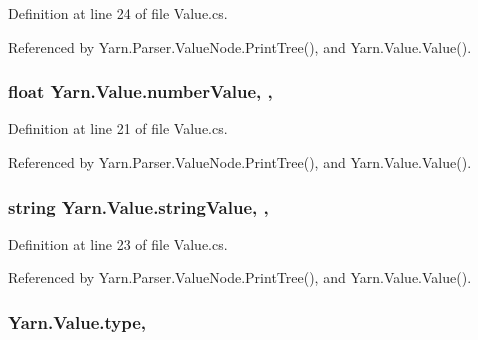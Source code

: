 Definition at line 24 of file Value.\-cs.



Referenced by Yarn.\-Parser.\-Value\-Node.\-Print\-Tree(), and Yarn.\-Value.\-Value().

\hypertarget{a00181_ae1892c1c7a8177537d1caa39a2e51da6}{
\subsubsection[{number\-Value}]{\setlength{\rightskip}{0pt plus 5cm}float Yarn.\-Value.\-number\-Value\hspace{0.3cm}{\ttfamily [get]}, {\ttfamily [set]}, {\ttfamily [package]}}}\label{a00181_ae1892c1c7a8177537d1caa39a2e51da6}


Definition at line 21 of file Value.\-cs.



Referenced by Yarn.\-Parser.\-Value\-Node.\-Print\-Tree(), and Yarn.\-Value.\-Value().

\hypertarget{a00181_add1b07146f1a9e4b655b33c93d07dff9}{
\subsubsection[{string\-Value}]{\setlength{\rightskip}{0pt plus 5cm}string Yarn.\-Value.\-string\-Value\hspace{0.3cm}{\ttfamily [get]}, {\ttfamily [set]}, {\ttfamily [package]}}}\label{a00181_add1b07146f1a9e4b655b33c93d07dff9}


Definition at line 23 of file Value.\-cs.



Referenced by Yarn.\-Parser.\-Value\-Node.\-Print\-Tree(), and Yarn.\-Value.\-Value().

\hypertarget{a00181_a6d5820fafa766911b9da84d1ed33e51a}{
\subsubsection[{type}]{ Yarn.\-Value.\-type\hspace{0.3cm}{\ttfamily [get]}, {\ttfamily [set]}}}\label{a00181_a6d5820fafa766911b9da84d1ed33e51a}


